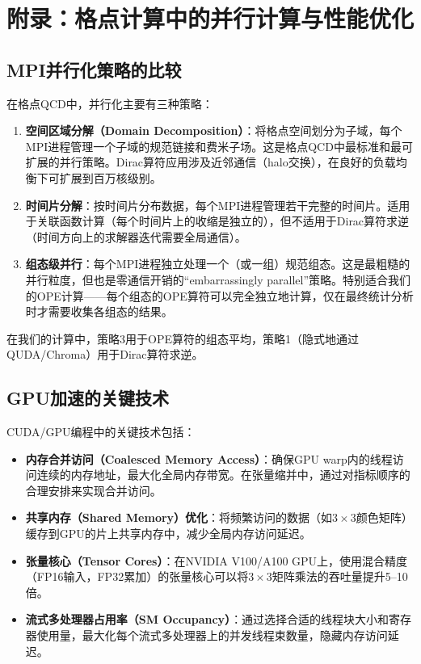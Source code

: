 \documentclass[11pt,a4paper]{ctexart}
\begin{document}
\section{附录：格点计算中的并行计算与性能优化}

\subsection{MPI并行化策略的比较}

在格点QCD中，并行化主要有三种策略：

\begin{enumerate}
  \item \textbf{空间区域分解（Domain Decomposition）}：将格点空间划分为子域，每个MPI进程管理一个子域的规范链接和费米子场。这是格点QCD中最标准和最可扩展的并行策略。Dirac算符应用涉及近邻通信（halo交换），在良好的负载均衡下可扩展到百万核级别。

  \item \textbf{时间片分解}：按时间片分布数据，每个MPI进程管理若干完整的时间片。适用于关联函数计算（每个时间片上的收缩是独立的），但不适用于Dirac算符求逆（时间方向上的求解器迭代需要全局通信）。

  \item \textbf{组态级并行}：每个MPI进程独立处理一个（或一组）规范组态。这是最粗糙的并行粒度，但也是零通信开销的``embarrassingly parallel''策略。特别适合我们的OPE计算——每个组态的OPE算符可以完全独立地计算，仅在最终统计分析时才需要收集各组态的结果。
\end{enumerate}

在我们的计算中，策略3用于OPE算符的组态平均，策略1（隐式地通过QUDA/Chroma）用于Dirac算符求逆。

\subsection{GPU加速的关键技术}

CUDA/GPU编程中的关键技术包括：

\begin{itemize}
  \item \textbf{内存合并访问（Coalesced Memory Access）}：确保GPU warp内的线程访问连续的内存地址，最大化全局内存带宽。在张量缩并中，通过对指标顺序的合理安排来实现合并访问。
  
  \item \textbf{共享内存（Shared Memory）优化}：将频繁访问的数据（如$3\times 3$颜色矩阵）缓存到GPU的片上共享内存中，减少全局内存访问延迟。
  
  \item \textbf{张量核心（Tensor Cores）}：在NVIDIA V100/A100 GPU上，使用混合精度（FP16输入，FP32累加）的张量核心可以将$3\times 3$矩阵乘法的吞吐量提升5--10倍。
  
  \item \textbf{流式多处理器占用率（SM Occupancy）}：通过选择合适的线程块大小和寄存器使用量，最大化每个流式多处理器上的并发线程束数量，隐藏内存访问延迟。
\end{itemize}
\end{document}
